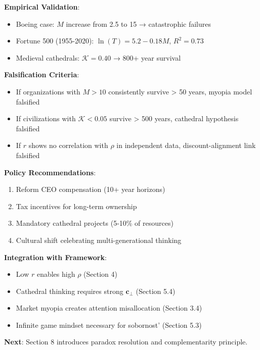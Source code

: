 \documentclass[11pt,a4paper]{article}
\theoremstyle{definition}
\theoremstyle{remark}
\newcommand{\cc}{\mathbf{c}}
\begin{document}
\begin{small}
\begin{enumerate}
\begin{mdframed}[backgroundcolor=green!10,linewidth=2pt,linecolor=green!70!black]
\textbf{Empirical Validation}:
\begin{itemize}[nosep]
    \item Boeing case: \(M\) increase from 2.5 to 15 → catastrophic failures
    \item Fortune 500 (1955-2020): \(\ln(T) = 5.2 - 0.18M\), \(R^2 = 0.73\)
    \item Medieval cathedrals: \(\mathcal{K} = 0.40\) → 800+ year survival
\end{itemize}

\textbf{Falsification Criteria}:
\begin{itemize}[nosep]
    \item If organizations with \(M > 10\) consistently survive > 50 years, myopia model falsified
    \item If civilizations with \(\mathcal{K} < 0.05\) survive > 500 years, cathedral hypothesis falsified
    \item If \(r\) shows no correlation with \(\rho\) in independent data, discount-alignment link falsified
\end{itemize}

\textbf{Policy Recommendations}:
\begin{enumerate}[nosep]
    \item Reform CEO compensation (10+ year horizons)
    \item Tax incentives for long-term ownership
    \item Mandatory cathedral projects (5-10\% of resources)
    \item Cultural shift celebrating multi-generational thinking
\end{enumerate}

\textbf{Integration with Framework}:
\begin{itemize}[nosep]
    \item Low \(r\) enables high \(\rho\) (Section 4)
    \item Cathedral thinking requires strong \(\cc_\perp\) (Section 5.4)
    \item Market myopia creates attention misallocation (Section 3.4)
    \item Infinite game mindset necessary for sobornost' (Section 5.3)
\end{itemize}

\textbf{Next}: Section 8 introduces paradox resolution and complementarity principle.
\end{mdframed}

\begin{figure}[H]
\centering
{}
\end{figure}
\end{enumerate}
\end{small}
\end{document}
